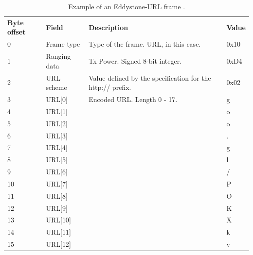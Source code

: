 \begin{table}[h!]
\centering
\caption{Example of an Eddystone-URL frame \cite{eddystone:protocol-url-spec}.}
\label{tbl:design:ble-positioning:eddystone-url}
\begin{tabular}{llll}
\textbf{Byte offset} & \textbf{Field} & \textbf{Description}                                       & \textbf{Value} \\
0                    & Frame type     & Type of the frame. URL, in this case.                      & 0x10           \\
1                    & Ranging data   & Tx Power. Signed 8-bit integer.                            & 0xD4           \\
2                    & URL scheme     & Value defined by the specification for the http:// prefix. & 0x02           \\
3                    & URL{[}0{]}     & Encoded URL. Length 0 - 17.                                & g              \\
4                    & URL{[}1{]}     &                                                            & o              \\
5                    & URL{[}2{]}     &                                                            & o              \\
6                    & URL{[}3{]}     &                                                            & .              \\
7                    & URL{[}4{]}     &                                                            & g              \\
8                    & URL{[}5{]}     &                                                            & l              \\
9                    & URL{[}6{]}     &                                                            & /              \\
10                   & URL{[}7{]}     &                                                            & P              \\
11                   & URL{[}8{]}     &                                                            & O              \\
12                   & URL{[}9{]}     &                                                            & K              \\
13                   & URL{[}10{]}     &                                                            & X              \\
14                   & URL{[}11{]}     &                                                            & k              \\
15                   & URL{[}12{]}     &                                                            & v             
\end{tabular}
\end{table}


